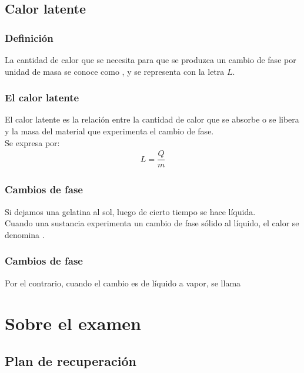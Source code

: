 \documentclass[14pt]{beamer}
\begin{document}
\subsection{Calor latente}

\begin{frame}
\frametitle{Definición}
La cantidad de calor que se necesita para que se produzca un cambio de fase por
unidad de masa se conoce como , y se representa con la letra $L$.
\end{frame}
\begin{frame}
\frametitle{El calor latente}
El calor latente es la relación entre la cantidad de calor que se absorbe o se
libera y la masa del material que experimenta el cambio de fase.
\\
\bigskip
\pause
Se expresa por:
\begin{align*}
L = \dfrac{Q}{m}
\end{align*}
\end{frame}
\begin{frame}
\frametitle{Cambios de fase}
Si dejamos una gelatina al sol, luego de cierto tiempo se hace líquida.
\\
\bigskip
\pause
Cuando una sustancia experimenta un cambio de fase sólido al líquido, el calor se denomina .
\end{frame}
\begin{frame}
\frametitle{Cambios de fase}
Por el contrario, cuando el cambio es de líquido a vapor, se llama 
\end{frame}

\section{Sobre el examen}
\subsection{Plan de recuperación}
\end{document}
